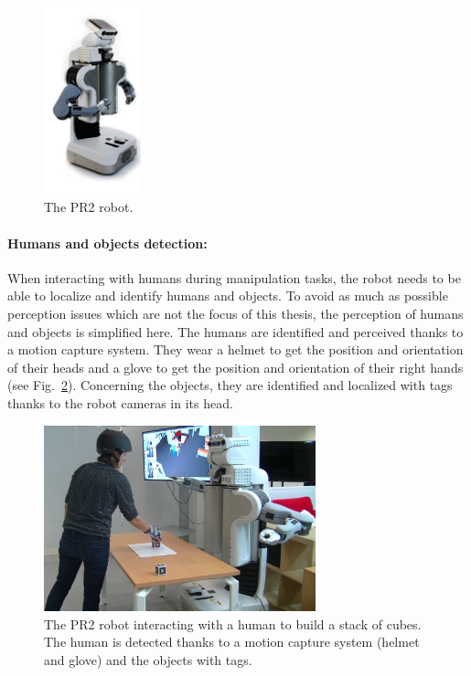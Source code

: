 \documentclass[english,a4paper,11pt,twoside]{StyleThese}
\begin{document}
\begin{figure}[!h]
	\centering
    \includegraphics[width=0.25\textwidth]{figs/Introduction/PR2.png}
    \caption{The PR2 robot.}
    \label{fig:PR2}
\end{figure}

\newpage
\paragraph{Humans and objects detection:} When interacting with humans during manipulation tasks, the robot needs to be able to localize and identify humans and objects. To avoid as much as possible perception issues which are not the focus of this thesis, the perception of humans and objects is simplified here. The humans are identified and perceived thanks to a motion capture system. They wear a helmet to get the position and orientation of their heads and a glove to get the position and orientation of their right hands (see Fig.~\ref{fig:Environment}). Concerning the objects, they are identified and localized with tags thanks to the robot cameras in its head.

\begin{figure}[!h]
	\centering
    \includegraphics[width=0.7\textwidth]{figs/Introduction/SetUp.png}
    \caption{The PR2 robot interacting with a human to build a stack of cubes. The human is detected thanks to a motion capture system (helmet and glove) and the objects with tags.}
    \label{fig:Environment}
\end{figure}
\end{document}
